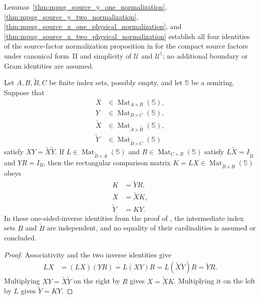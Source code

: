 Lemmas~\ref{thm:mpug_source_y_one_normalization},
\ref{thm:mpug_source_y_two_normalization},
\ref{thm:mpug_source_x_one_physical_normalization}, and
\ref{thm:mpug_source_x_two_physical_normalization} establish all four
identities of the source-factor normalization proposition in
\cite[lines~1064--1162]{FrancoRubio2025MPUGauging} for the compact source
factors under canonical form~II and simplicity of $\mathcal U$ and
$\mathcal U^\dagger$; no additional boundary or Gram identities are assumed.

\begin{lemma}
    \label{thm:mpug_factorization_comparison}
    \leanok
    Let $A,B,\widetilde B,C$ be finite index sets, possibly empty, and let
    $\mathbb S$ be a semiring. Suppose that
    \begin{align}
        X            & \in\operatorname{Mat}_{A\times B}(\mathbb S),           \\
        Y            & \in\operatorname{Mat}_{B\times C}(\mathbb S),           \\
        \widetilde X & \in\operatorname{Mat}_{A\times\widetilde B}(\mathbb S), \\
        \widetilde Y & \in\operatorname{Mat}_{\widetilde B\times C}(\mathbb S)
    \end{align}
    satisfy $XY=\widetilde X\widetilde Y$. If
    $L\in\operatorname{Mat}_{\widetilde B\times A}(\mathbb S)$ and
    $R\in\operatorname{Mat}_{C\times B}(\mathbb S)$ satisfy
    $L\widetilde X=I_{\widetilde B}$ and $YR=I_B$, then the rectangular
    comparison matrix $K=LX\in\operatorname{Mat}_{\widetilde B\times B}(\mathbb S)$
    obeys
    \begin{align}
        K            & =\widetilde YR, \\
        X            & =\widetilde XK, \\
        \widetilde Y & =KY.
    \end{align}
    In these one-sided-inverse identities from the proof of
    \cite[lines~1052--1066]{FrancoRubio2025MPUGauging}, the intermediate
    index sets $B$ and $\widetilde B$ are independent, and no equality of
    their cardinalities is assumed or concluded.
\end{lemma}
\begin{proof}\leanok
    Associativity and the two inverse identities give
    \begin{align}
        LX & =(LX)(YR)=L(XY)R
        =L(\widetilde X\widetilde Y)R=\widetilde YR.
    \end{align}
    Multiplying $XY=\widetilde X\widetilde Y$ on the right by $R$ gives
    $X=\widetilde XK$. Multiplying it on the left by $L$ gives
    $\widetilde Y=KY$.
\end{proof}

